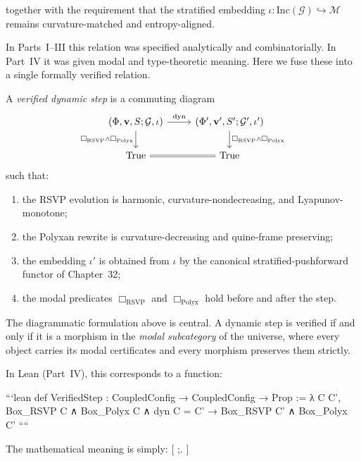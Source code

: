 together with the requirement that the stratified embedding
$\iota : \mathrm{Inc}(\mathcal{G}) \hookrightarrow \mathcal{M}$
remains curvature-matched and entropy-aligned.

In Parts~I–III this relation was specified analytically and combinatorially.
In Part~IV it was given modal and type-theoretic meaning.
Here we fuse these into a single formally verified relation.

\begin{definition}
\label{def:verified-step}
A \emph{verified dynamic step} is a commuting diagram
\[
\begin{tikzcd}
(\Phi,\mathbf{v},S;\mathcal{G},\iota)
  \arrow[r,"\mathrm{dyn}"] \arrow[d,swap,"\Box_{\mathrm{RSVP}}\wedge\Box_{\mathrm{Polyx}}"]
&
(\Phi',\mathbf{v}',S';\mathcal{G}',\iota')
  \arrow[d,"\Box_{\mathrm{RSVP}}\wedge\Box_{\mathrm{Polyx}}"]
\\
\mathrm{True} \arrow[r,equal]
&
\mathrm{True}
\end{tikzcd}
\]
such that:
\begin{enumerate}[label=\arabic*)]
  \item the RSVP evolution is harmonic, curvature-nondecreasing,
        and Lyapunov-monotone;
  \item the Polyxan rewrite is curvature-decreasing and
        quine-frame preserving;
  \item the embedding $\iota'$ is obtained from $\iota$ by the
        canonical stratified-pushforward functor of Chapter~32;
  \item the modal predicates
        $\Box_{\mathrm{RSVP}}$ and $\Box_{\mathrm{Polyx}}$
        hold before and after the step.
\end{enumerate}
\end{definition}

The diagrammatic formulation above is central.
A dynamic step is verified if and only if it is
a morphism in the \emph{modal subcategory} of the universe,
where every object carries its modal certificates and every morphism
preserves them strictly.

In Lean (Part~IV), this corresponds to a function:

```lean
def VerifiedStep :
  CoupledConfig → CoupledConfig → Prop :=
λ C C', Box_RSVP C ∧ Box_Polyx C ∧ dyn C = C' →
          Box_RSVP C' ∧ Box_Polyx C'
````

The mathematical meaning is simply:
[
 ;.
]

